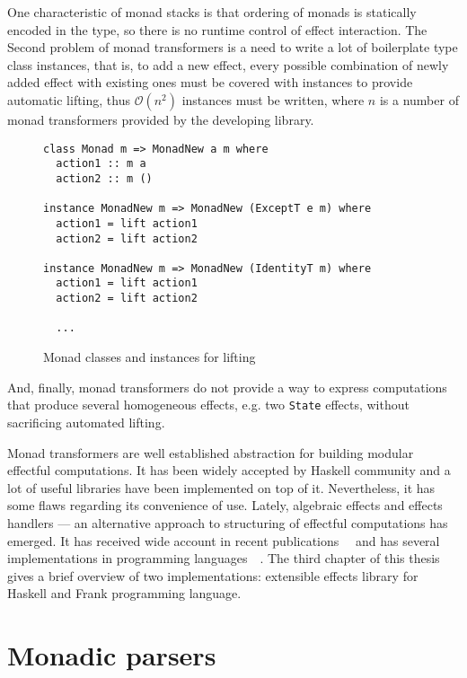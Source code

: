       One characteristic of monad stacks is that ordering of monads is statically encoded
      in the type, so there is no runtime control of effect interaction.
      The Second problem of monad transformers is a need to write a lot of boilerplate
      type class instances, that is, to add a new effect, every possible combination
      of newly added effect with existing ones must be covered with instances to provide
      automatic lifting, thus $\mathcal{O}(n^2)$ instances must be written,
      where $n$ is a number of monad transformers provided by the developing library.

      \begin{figure}[h]
      \begin{lstlisting}
class Monad m => MonadNew a m where
  action1 :: m a
  action2 :: m ()

instance MonadNew m => MonadNew (ExceptT e m) where
  action1 = lift action1
  action2 = lift action2

instance MonadNew m => MonadNew (IdentityT m) where
  action1 = lift action1
  action2 = lift action2

  ...
      \end{lstlisting}
      \caption{Monad classes and instances for lifting}
      \label{listing:mtlLift}
      \end{figure}

      And, finally, monad transformers do not provide a way to express computations that
      produce several homogeneous effects, e.g. two \texttt{State} effects, without
      sacrificing automated lifting.

      Monad transformers are well established abstraction for building modular effectful
      computations. It has been widely accepted by Haskell community and a lot of
      useful libraries have been implemented on top of it. Nevertheless, it has some
      flaws regarding its convenience of use. Lately, algebraic effects and effects
      handlers --- an alternative approach to structuring of effectful computations
      has emerged. It has received wide account in recent
      publications~\cite{DBLP:journals/jlp/BauerP15}~\cite{Kiselyov:2013:EEA:2578854.2503791}
      and has several implementations in programming
      languages~\cite{Kiselyov:2013:EEA:2578854.2503791}~\cite{DBLP:conf/popl/LindleyMM17}.
      The third chapter of this thesis gives a brief overview of two
      implementations: extensible effects library for Haskell and Frank programming language.

  \section{Monadic parsers}
  \label{cpt-parsers:monadic}


